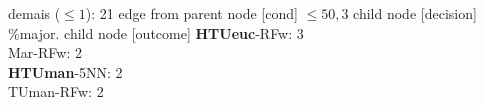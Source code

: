 {{{{%
demais ($\leq 1$): 21} edge from parent node [cond] {$\leq50,3$}}
child {node [decision] {\%major.}
child {node [outcome] {
\textbf{HTUeuc}-RFw: 3\\
Mar-RFw: 2\\
\textbf{HTUman}-5NN: 2\\
TUman-RFw: 2\\
}}}}}
